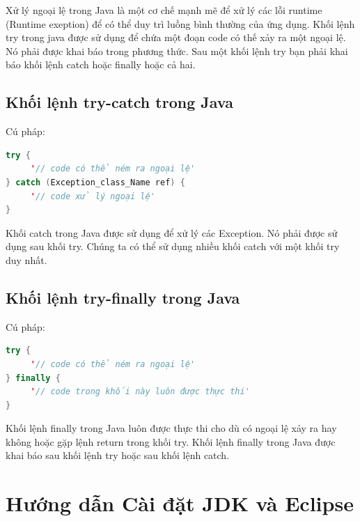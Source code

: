 \indent Xử lý ngoại lệ trong Java là một cơ chế mạnh mẽ để xử lý các lỗi runtime (Runtime exeption) để có thể duy trì luồng bình thường của ứng dụng. Khối lệnh try trong java được sử dụng để chứa một đoạn code có thế xảy ra một ngoại lệ. Nó phải được khai báo trong phương thức. Sau một khối lệnh try bạn phải khai báo khối lệnh catch hoặc finally hoặc cả hai.
\subsection{Khối lệnh try-catch trong Java}
\indent Cú pháp:
\begin{lstlisting}[escapechar=',language=java]	
try {  
     '// code có thể ném ra ngoại lệ'
} catch (Exception_class_Name ref) {
     '// code xử lý ngoại lệ'
} 
\end{lstlisting}

\indent Khối catch trong Java được sử dụng để xử lý các Exception. Nó phải được sử dụng sau khối try. Chúng ta có thể sử dụng nhiều khối catch với một khối try duy nhất.
\subsection{Khối lệnh try-finally trong Java}
\indent Cú pháp:
\begin{lstlisting}[escapechar=',language=java]	
try {  
     '// code có thể ném ra ngoại lệ'
} finally {
     '// code trong khối này luôn được thực thi'
}
\end{lstlisting}

\indent Khối lệnh finally trong Java luôn được thực thi cho dù có ngoại lệ xảy ra hay không hoặc gặp lệnh return trong khối try. Khối lệnh finally trong Java được khai báo sau khối lệnh try hoặc sau khối lệnh catch. 
\section{Hướng dẫn Cài đặt JDK và Eclipse}
